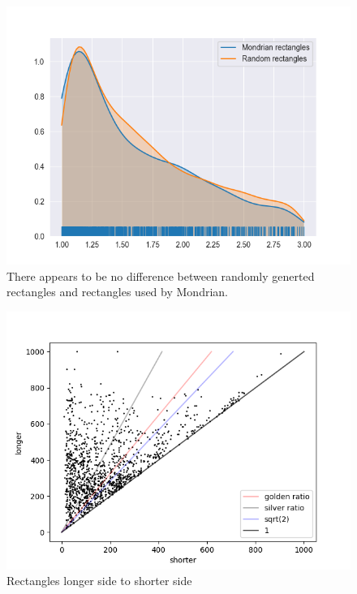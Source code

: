 \documentclass[serif,article,noparskip]{agse-thesis}
\begin{document}
\begin{figure}
\includegraphics[width=\linewidth]{images/aspect-max-min-rects.png}
\caption{There appears to be no difference between randomly generted rectangles and rectangles used by Mondrian.}
\label{fig:aspect-rects}
\end{figure}

\begin{figure}
\includegraphics[width=\linewidth]{images/longer-x-shorter.png}
\caption{Rectangles longer side to shorter side}
\label{fig:longer-x-shorter}
\end{figure}


\end{document}
